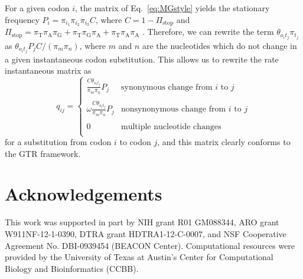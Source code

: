 \documentclass[11pt]{article}
\begin{document}
For a given codon $i$, the matrix of Eq.\ \eqref{eq:MGstyle} yields the stationary frequency $P_i = \pi_{i_1}\pi_{i_2}\pi_{i_3}C$, where $C = 1 - \Pi_\text{stop}$ and $\Pi_\text{stop} = \pi_\text{T}\pi_\text{A}\pi_\text{G} + \pi_\text{T}\pi_\text{G}\pi_\text{A} + \pi_\text{T}\pi_\text{A}\pi_\text{A}$ \citep{MuseGaut1994}. Therefore, we can rewrite the term $\theta_{o_it_j}\pi_{t_j}$ as $\theta_{o_it_j}P_jC / (\pi_m\pi_n)$, where $m$ and $n$ are the nucleotides which do not change in a given instantaneous codon substitution. This allows us to rewrite the rate instantaneous matrix as 
\begin{equation}
q_{ij} = \left\{ 
\begin{array}{rl}
\frac{C\theta_{o_it_j}}{\pi_m\pi_n} P_j           &\text{synonymous change from $i$ to $j$} \\\\
\omega\frac{C\theta_{o_it_j}}{\pi_m\pi_n} P_j     &\text{nonsynonymous change from $i$ to $j$} \\\\
0                                              &\text{multiple nucleotide changes} \\           
\end{array} \right.
\end{equation} for a substitution from codon $i$ to codon $j$, and this matrix clearly conforms to the GTR framework.
		
\section*{Acknowledgements}
This work was supported in part by NIH grant R01 GM088344, ARO grant W911NF-12-1-0390, DTRA grant HDTRA1-12-C-0007, and NSF Cooperative Agreement No. DBI-0939454 (BEACON Center).  Computational resources were provided by the University of Texas at Austin's Center for Computational Biology and Bioinformatics (CCBB).

\newpage
		
\end{document}
